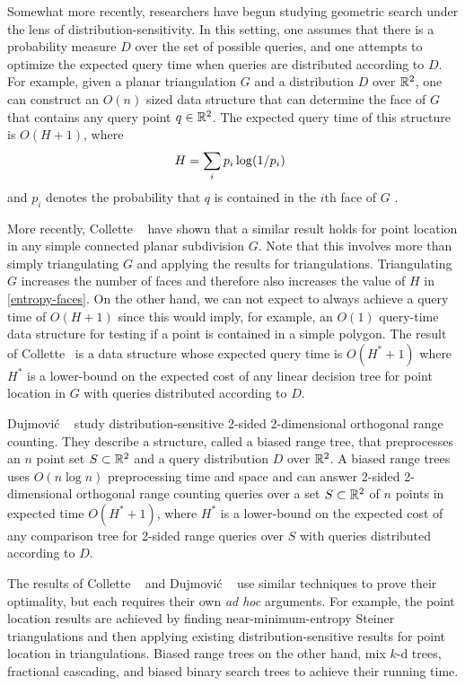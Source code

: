 \documentclass{patmorin}
\begin{document}
Somewhat more recently, researchers have begun studying geometric search
under the lens of distribution-sensitivity. In this setting, one assumes
that there is a probability measure $D$ over the set of possible queries,
and one attempts to optimize the expected query time when queries are
distributed according to $D$.  For example, given a planar triangulation $G$ and a distribution $D$ over $\mathbb{R}^2$, one can construct an $O(n)$ sized data structure that
can determine the face of $G$ that contains any query point $q\in\mathbb{R}^2$.
The expected query time of this structure is $O(H+1)$, where
\begin{equation}
    H = \sum_{i} p_i\log (1/p_i)  \enspace  \eqlabel{entropy-faces}
\end{equation}
and $p_i$ denotes the probability that $q$ is contained in the $i$th
face of $G$ \cite{acmr00,amm00,amm01a,amm01b,ammw07,i01,i04}.

More recently, Collette \etal\ \cite{cdilm08,cdilm09} have shown that a
similar result holds for point location in any simple connected planar
subdivision $G$.  Note that this involves more than simply triangulating
$G$ and applying the results for triangulations.  Triangulating $G$
increases the number of faces and therefore also increases the value of
$H$ in \eqref{entropy-faces}.  On the other hand, we can not expect to
always achieve a query time of $O(H+1)$ since this would imply, for
example, an $O(1)$ query-time data structure for testing if a point
is contained in a simple polygon.  The result of Collette \etal\  is
a data structure whose expected query time is $O(H^*+1)$ where $H^*$
is a lower-bound on the expected cost of any linear decision tree for
point location in $G$ with queries distributed according to $D$.

Dujmovi\'c \etal\ \cite{dhm09} study distribution-sensitive 2-sided
2-dimensional orthogonal range counting.  They describe a structure,
called a biased range tree, that preprocesses an $n$ point set
$S\subset\mathbb{R}^2$ and a query distribution $D$ over $\mathbb{R}^2$.  A biased range
trees uses $O(n\log n)$ preprocessing time and space and can answer
2-sided 2-dimensional orthogonal range counting queries over a set
$S\subset\mathbb{R}^2$ of $n$ points in expected time $O(H^*+1)$, where $H^*$
is a lower-bound on the expected cost of any comparison tree for 2-sided
range queries over $S$ with queries distributed according to $D$.

The results of Collette \etal\ \cite{cdilm08,cdilm09} and Dujmovi\'c
\etal\ \cite{dhm09} use similar techniques to prove their optimality,
but each requires their own \textit{ad hoc} arguments.  For example, the point
location results are achieved by finding near-minimum-entropy Steiner
triangulations and then applying existing distribution-sensitive results
for point location in triangulations.  Biased range trees on the other
hand, mix $k$-d trees, fractional cascading, and biased binary search
trees to achieve their running time.
\end{document}

